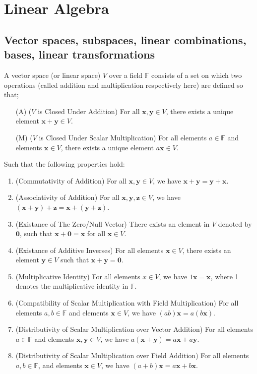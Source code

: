 \documentclass[../Notes.tex]{subfiles}
\begin{document}
\chapter{Linear Algebra}
\section{Vector spaces, subspaces, linear combinations, bases, linear transformations}
\begin{definition}{}{}
    A vector space (or linear space) \(V\) over a field \(\mathbb{F}\) consists of a set on which two operations (called addition and multiplication respectively here) are defined so that;
\begin{itemize}[label=(M1),leftmargin=*]
    \item[(A)](\(V\) is Closed Under Addition) For all \(\mathbf{x},\mathbf{y} \in V\), there exists a unique element \(\mathbf{x}+\mathbf{y} \in V\).
    \item[(M)](\(V\) is Closed Under Scalar Multiplication) For all elements \(a \in \mathbb{F}\) and elements \(\mathbf{x} \in V\), there exists a unique element \(a\mathbf{x} \in V\).
\end{itemize}
Such that the following properties hold:  
\begin{enumerate}[label=(VS {{\arabic*}}), leftmargin=*]
    \item \label{(VS 1)}(Commutativity of Addition) For all \(\mathbf{x},\mathbf{y} \in V\), we have \(\mathbf{x}+\mathbf{y}=\mathbf{y}+\mathbf{x}\).
    \item \label{(VS 2)}(Associativity of Addition) For all \(\mathbf{x},\mathbf{y},\mathbf{z} \in V\), we have \((\mathbf{x}+\mathbf{y})+\mathbf{z}=\mathbf{x}+(\mathbf{y}+\mathbf{z})\).
    \item \label{(VS 3)}(Existance of The Zero/Null Vector) There exists an element in \(V\) denoted by \({\mathbf{0}}\), such that \(\mathbf{x}+{\mathbf{0}}=\mathbf{x}\) for all \(\mathbf{x} \in V\).
    \item \label{(VS 4)}(Existance of Additive Inverses) For all elements \(\mathbf{x} \in V\), there exists an element \(\mathbf{y} \in V\) such that \(\mathbf{x}+\mathbf{y}={\mathbf{0}}\).
    \item \label{(VS 5)}(Multiplicative Identity) For all elements \(x \in V\), we have \(1\mathbf{x}=\mathbf{x}\), where 1 denotes the multiplicative identity in \(\mathbb{F}\).
    \item \label{(VS 6)}(Compatibility of Scalar Multiplication with Field Multiplication) For all elements \(a,b \in \mathbb{F}\) and elements \(\mathbf{x} \in V\), we have \((ab)\mathbf{x}=a(b\mathbf{x})\).
    \item \label{(VS 7)}(Distributivity of Scalar Multiplication over Vector Addition) For all elements \(a \in \mathbb{F}\) and elements \(\mathbf{x},\mathbf{y} \in V\), we have \(a(\mathbf{x}+\mathbf{y})=a\mathbf{x}+a\mathbf{y}\).
    \item \label{(VS 8)}(Distributivity of Scalar Multiplication over Field Addition) For all elements \(a,b \in \mathbb{F}\), and elements \(\mathbf{x} \in V\), we have \((a+b)\mathbf{x}=a\mathbf{x}+b\mathbf{x}\).
\end{enumerate}
\end{definition}
\end{document}
